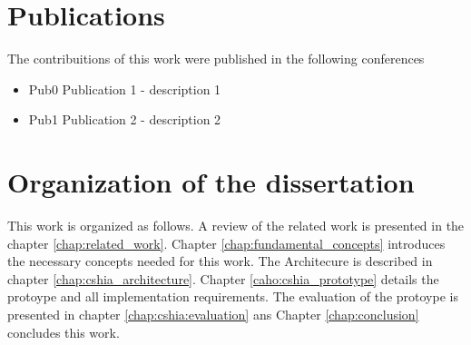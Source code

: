 \section{Publications}
\label{sec:publications}
The contribuitions of this work were published  in the following conferences 
\begin{itemize}
\item{Pub0} Publication 1  - description 1
\item{Pub1} Publication 2 - description 2
\end{itemize}

\section{Organization of the dissertation}
\label{sec:organization_of_dissertation}
This work is organized as follows.  A review of the related work is presented in the chapter \ref{chap:related_work}. Chapter \ref{chap:fundamental_concepts} introduces the necessary concepts  needed for this work. The Architecure is described in chapter \ref{chap:cshia_architecture}. Chapter \ref{caho:cshia_prototype} details the protoype and all implementation requirements. The evaluation of the protoype is presented in chapter \ref{chap:cshia:evaluation} ans Chapter \ref{chap:conclusion} concludes this work.


